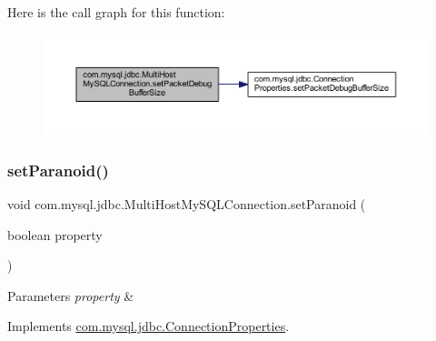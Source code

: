 Here is the call graph for this function\+:
\nopagebreak
\begin{figure}[H]
\begin{center}
\leavevmode
\includegraphics[width=350pt]{classcom_1_1mysql_1_1jdbc_1_1_multi_host_my_s_q_l_connection_a40dfa273870f39c257a9eb9feaad70b0_cgraph}
\end{center}
\end{figure}
\mbox{\label{classcom_1_1mysql_1_1jdbc_1_1_multi_host_my_s_q_l_connection_a90febab2aa995ba6ef06ebaf57ffd087}} 
\subsubsection{\texorpdfstring{set\+Paranoid()}{setParanoid()}}
{\footnotesize\ttfamily void com.\+mysql.\+jdbc.\+Multi\+Host\+My\+S\+Q\+L\+Connection.\+set\+Paranoid (\begin{DoxyParamCaption}\item[{boolean}]{property }\end{DoxyParamCaption})}


\begin{DoxyParams}{Parameters}
{\em property} & \\
\hline
\end{DoxyParams}


Implements \mbox{\hyperlink{interfacecom_1_1mysql_1_1jdbc_1_1_connection_properties_a01cf4f506ad942b96a36708c33221a48}{com.\+mysql.\+jdbc.\+Connection\+Properties}}.


